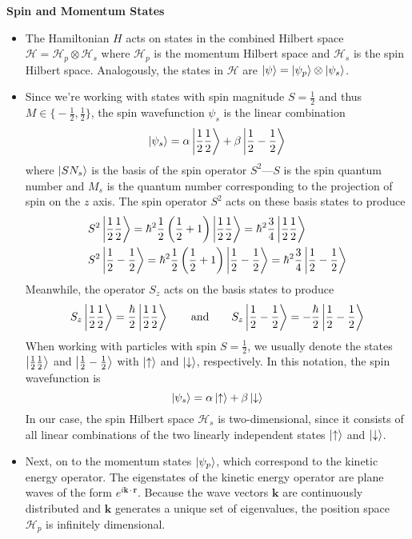 \documentclass[11pt, a4paper]{article}
\newcommand{\eqtext}[1]{\qquad \text{#1} \qquad}
\renewcommand{\vec}[1]{\bm{#1}} %
\renewcommand{\H}{\mathcal{H}}  %
\newcommand{\ua}{\uparrow}  %
\newcommand{\da}{\downarrow}  %
\begin{document}
\vspace{2mm}
\textbf{Spin and Momentum States}
\begin{itemize}
	\item The Hamiltonian $ H $ acts on states in the combined Hilbert space 
	$ \H = \H_{p}\otimes \H_{s} $ where $ \H_{p} $ is the momentum Hilbert space and $ \H_{s} $ is the spin Hilbert space. Analogously, the states in $ \H $ are $ \ket{\psi} = \ket{\psi_{p}} \otimes \ket{\psi_{s}}$. 
	
	\item Since we're working with states with spin magnitude $ S = \frac{1}{2} $ and thus $ M \in  \big\{-\tfrac{1}{2}, \tfrac{1}{2}\big\} $, the spin wavefunction $ \psi_{s} $ is the linear combination
	\begin{equation*}
		\ket{\psi_{s}} = \alpha \ket{\frac{1}{2}\frac{1}{2}} + \beta \ket{\frac{1}{2}-\frac{1}{2}}
	\end{equation*}
	where $ \ket{SN_{s}} $ is the basis of the spin operator $ S^{2} $---$ S $ is the spin quantum number and $ M_{s} $ is the quantum number corresponding to the projection of spin on the $ z $ axis. The spin operator $ S^{2} $ acts on these basis states to produce
	\begin{align*}
		&S^{2} \ket{\frac{1}{2}\frac{1}{2}} = \hbar^{2} \frac{1}{2}\left(\frac{1}{2} + 1\right ) \ket{\frac{1}{2}\frac{1}{2}} = \hbar^{2} \frac{3}{4} \ket{\frac{1}{2}\frac{1}{2}}\\
		& S^{2} \ket{\frac{1}{2}-\frac{1}{2}} = \hbar^{2} \frac{1}{2}\left (\frac{1}{2} + 1\right ) \ket{\frac{1}{2}-\frac{1}{2}} = \hbar^{2} \frac{3}{4} \ket{\frac{1}{2}-\frac{1}{2}}
	\end{align*}
	Meanwhile, the operator $ S_{z} $ acts on the basis states to produce
	\begin{equation*}
		S_{z} \ket{\frac{1}{2}\frac{1}{2}} = \frac{\hbar}{2} \ket{\frac{1}{2}\frac{1}{2}} \eqtext{and} S_{z} \ket{\frac{1}{2}-\frac{1}{2}} = -\frac{\hbar}{2} \ket{\frac{1}{2}-\frac{1}{2}}
	\end{equation*}
	When working with particles with spin $ S = \frac{1}{2} $, we usually denote the states $  \ket{\frac{1}{2}\frac{1}{2}}  $ and $  \ket{\frac{1}{2}-\frac{1}{2}}  $ with $ \ket{\ua} $ and $ \ket{\da} $, respectively. In this notation, the spin wavefunction is
	\begin{equation*}
		\ket{\psi_{s}} = \alpha \ket{\ua} + \beta \ket{\da}
	\end{equation*}
	In our case, the spin Hilbert space $ \H_{s} $ is two-dimensional, since it consists of all linear combinations of the two linearly independent states $ \ket{\ua} $ and $ \ket{\da} $. 
	
	\item Next, on to the momentum states $ \ket{\psi_{p}} $, which correspond to the kinetic energy operator. The eigenstates of the kinetic energy operator are plane waves of the form $ e^{i\vec{k}\cdot \vec{r}} $. Because the wave vectors $ \vec{k} $ are continuously distributed and $ \vec{k} $ generates a unique set of eigenvalues, the position space $ \H_{p} $ is infinitely dimensional.
\end{itemize}
\end{document}

